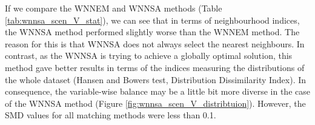 		\begin{table}[h]
			\caption{Quality measures for Scenario V. %
			}
			\label{tab:wnnsa_scen_V_stat}
			\centering
		\end{table}
								
		If we compare the WNNEM and WNNSA methods (Table \ref{tab:wnnsa_scen_V_stat}), we can see that in terms of neighbourhood indices, the WNNSA method performed slightly worse than the WNNEM method. The reason for this is that WNNSA does not always select the nearest neighbours. In contrast, as the WNNSA is trying to achieve a globally optimal solution, this method gave better results in terms of the indices measuring the distributions of the whole dataset (Hansen and Bowers test, Distribution Dissimilarity Index). In consequence, the variable-wise balance may be a little bit more diverse in the case of the WNNSA method (Figure \ref{fig:wnnsa_scen_V_distribtuion}). However, the SMD values for all matching methods were less than 0.1.
		
